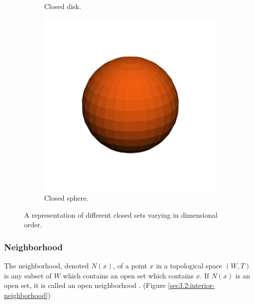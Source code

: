 \documentclass[a4paper,11pt,oneside]{article}
\begin{document}
\begin{figure}[ht]
\begin{subfigure}[b]{0.3\textwidth}
         \caption{Closed disk.}
     \end{subfigure}
     \hfill
     \begin{subfigure}[b]{0.3\textwidth}
         \centering
         \includegraphics[width=\textwidth]{section3/3.2/closed-sphere.png}
         \caption{Closed sphere.}
     \end{subfigure}
     \hfill
        \caption{A representation of different closed sets varying in dimensional order.}
        \label{sec3.2:closed-sets}
\end{figure}

\subsubsection{Neighborhood}
     
\begin{definition}
	The neighborhood, denoted $N(x)$, of a point $x$ in a topological space $(W, T)$ is any subset of $W$ which contains an open set which contains $x$. If $N(x)$ is an open set, it is called an open neighborhood \cite{Requicha1978MathematicalFO}. (Figure \ref{sec3.2:interior-neighborhood})
\end{definition}
\end{document}
